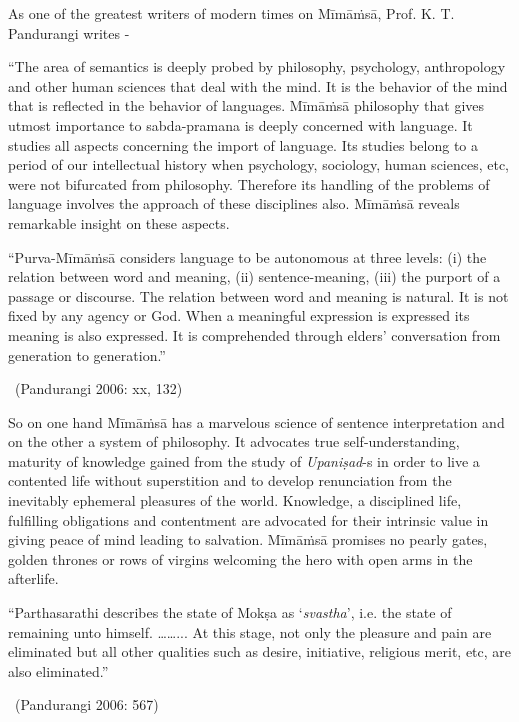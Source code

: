 As one of the greatest writers of modern times on Mīmāṁsā, Prof. K. T. Pandurangi writes -

\begin{myquote}
“The area of semantics is deeply probed by philosophy, psychology, anthropology and other human sciences that deal with the mind. It is the behavior of the mind that is reflected in the behavior of languages. Mīmāṁsā philosophy that gives utmost importance to sabda-pramana is deeply concerned with language. It studies all aspects concerning the import of language. Its studies belong to a period of our intellectual history when psychology, sociology, human sciences, etc, were not bifurcated from philosophy. Therefore its handling of the problems of language involves the approach of these disciplines also. Mīmāṁsā reveals remarkable insight on these aspects.
\end{myquote}

\begin{myquote}
“Purva-Mīmāṁsā considers language to be autonomous at three levels: (i) the relation between word and meaning, (ii) sentence-meaning, (iii) the purport of a passage or discourse. The relation between word and meaning is natural. It is not fixed by any agency or God. When a meaningful expression is expressed its meaning is also expressed. It is comprehended through elders’ conversation from generation to generation.” 

~\hfill (Pandurangi 2006: xx, 132)
\end{myquote}

So on one hand Mīmāṁsā has a marvelous science of sentence interpretation and on the other a system of philosophy. It advocates true self-understanding, maturity of knowledge gained from the study of \textit{Upaniṣad}-s in order to live a contented life without superstition and to develop renunciation from the inevitably ephemeral pleasures of the world. Knowledge, a disciplined life, fulfilling obligations and contentment are advocated for their intrinsic value in giving peace of mind leading to salvation. Mīmāṁsā promises no pearly gates, golden thrones or rows of virgins welcoming the hero with open arms in the afterlife.

\begin{myquote}
“Parthasarathi describes the state of Mokṣa as ‘\textit{svastha}’, i.e. the state of remaining unto himself. ……... At this stage, not only the pleasure and pain are eliminated but all other qualities such as desire, initiative, religious merit, etc, are also eliminated.” 

~\hfill (Pandurangi 2006: 567)
\end{myquote}

